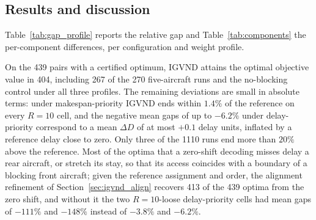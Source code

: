 \subsection{Results and discussion}
\label{sec:results}

Table~\ref{tab:gap_profile} reports the relative gap and
Table~\ref{tab:components} the per-component differences, per
configuration and weight profile.





On the 439 pairs with a certified optimum, IGVND attains the optimal
objective value in 404, including 267 of the 270 five-aircraft runs and
the no-blocking control under all three profiles.  The remaining
deviations are small in absolute terms: under makespan-priority IGVND
ends within $1.4\%$ of the reference on every $R{=}10$ cell, and the
negative mean gaps of up to $-6.2\%$ under delay-priority correspond to
a mean $\Delta D$ of at most $+0.1$ delay units, inflated by a reference
delay close to zero.  Only three of the 1110 runs end more than $20\%$
above the reference.  Most of the optima that a zero-shift decoding
misses delay a rear aircraft, or stretch its stay, so that its access
coincides with a boundary of a blocking front aircraft; given the
reference assignment and order, the alignment refinement of
Section~\ref{sec:igvnd_align} recovers 413 of the 439 optima from the zero
shift, and without it the two $R{=}10$-loose delay-priority cells had
mean gaps of $-111\%$ and $-148\%$ instead of $-3.8\%$ and $-6.2\%$.

